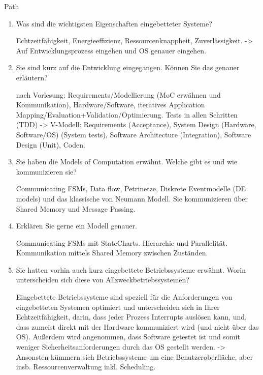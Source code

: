 \documentclass{article}
\author{Leopold Lemmermann}
\begin{document}
\createtitle

\begin{exercise}{Path}
  \begin{enumerate}
    \item Was sind die wichtigsten Eigenschaften eingebetteter Systeme?
          \begin{solution}
            Echtzeitfähigkeit, Energieeffizienz, Ressourcenknappheit, Zuverlässigkeit. -> Auf Entwicklungsprozess eingehen und OS genauer eingehen.
          \end{solution}

    \item Sie sind kurz auf die Entwicklung eingegangen. Können Sie das genauer erläutern?
          \begin{solution}
            nach Vorlesung: Requirements/Modellierung (MoC erwähnen und Kommunikation), Hardware/Software, iteratives Application Mapping/Evaluation+Validation/Optimierung.
            Tests in allen Schritten (TDD) -> V-Modell: Requirements (Acceptance), System Design (Hardware, Software/OS) (System tests), Software Architecture (Integration), Software Design (Unit), Coden.
          \end{solution}

    \item Sie haben die Models of Computation erwähnt. Welche gibt es und wie kommunizieren sie?
          \begin{solution}
            Communicating FSMs, Data flow, Petrinetze, Diskrete Eventmodelle (DE models) und das klassische von Neumann Modell. Sie kommunizieren über Shared Memory und Message Passing.
          \end{solution}

    \item Erklären Sie gerne ein Modell genauer.
          \begin{solution}
            Communicating FSMs mit StateCharts. Hierarchie und Parallelität. Kommunikation mittels Shared Memory zwischen Zuständen.
          \end{solution}

    \item Sie hatten vorhin auch kurz eingebettete Betriebssysteme erwähnt. Worin unterscheiden sich diese von Allzweckbetriebssystemen?
          \begin{solution}
            Eingebettete Betriebssysteme sind speziell für die Anforderungen von eingebetteten Systemen optimiert und unterscheiden sich in Ihrer Echtzeitfähigkeit, darin, dass jeder Prozess Interrupts auslösen kann, und, dass zumeist direkt mit der Hardware kommuniziert wird (und nicht über das OS). Außerdem wird angenommen, dass Software getestet ist und somit weniger Sicherheitsanforderungen durch das OS gestellt werden. -> Ansonsten kümmern sich Betriebssysteme um eine Benutzeroberfläche, aber insb. Ressourcenverwaltung inkl. Scheduling.
          \end{solution}


\end{enumerate}
\end{exercise}
\end{document}
